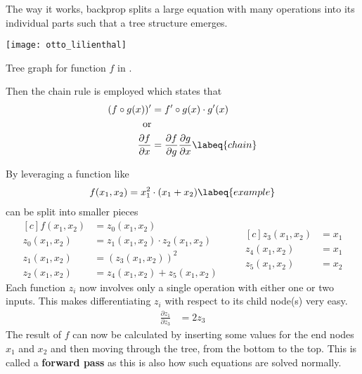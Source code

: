 The way it works, backprop splits a large equation with many operations into its individual parts such that a tree structure emerges.
\begin{marginfigure}
    \texttt{[image: otto\_lilienthal]}
    \caption[]{Tree graph for function $f$ in .}
\end{marginfigure}
Then the chain rule is employed which states that
\begin{align}
    (f \circ g (x))' & = f' \circ g(x) \cdot g'(x) \\
    \text{or} \nonumber\\
    \frac{\partial f}{\partial x} & = \frac{\partial f}{\partial g} \frac{\partial g}{\partial x}
    \labeq{chain}
\end{align}

By leveraging  a function like 
\begin{align}
    f(x_1, x_2) = x_1^2 \cdot (x_1 + x_2)
    \labeq{example}
\end{align}
can be split into smaller pieces
\begin{equation*}
\begin{aligned}[c]
    f(x_1, x_2) & = z_0(x_1, x_2) \\
    z_0(x_1, x_2) & = z_1(x_1, x_2) \cdot z_2(x_1, x_2) \\
    z_1(x_1, x_2) & = (z_3(x_1, x_2))^2 \\
    z_2(x_1, x_2) & = z_4(x_1, x_2) + z_5(x_1, x_2)
\end{aligned}
\qquad
\begin{aligned}[c]
    z_3(x_1, x_2) & = x_1 \\
    z_4(x_1, x_2) & = x_1 \\
    z_5(x_1, x_2) & = x_2
\end{aligned}
\end{equation*}
Each function $z_i$ now involves only a single operation with either one or two inputs.
This makes differentiating $z_i$ with respect to its child node(s) very easy.
\eg
\begin{align}
    \frac{\partial z_1}{\partial z_3} & = 2 z_3
\end{align}
The result of $f$ can now be calculated by inserting some values for the end nodes $x_1$ and $x_2$ and then moving through the tree, from the bottom to the top.
This is called a \textbf{forward pass} as this is also how such equations are solved normally.
